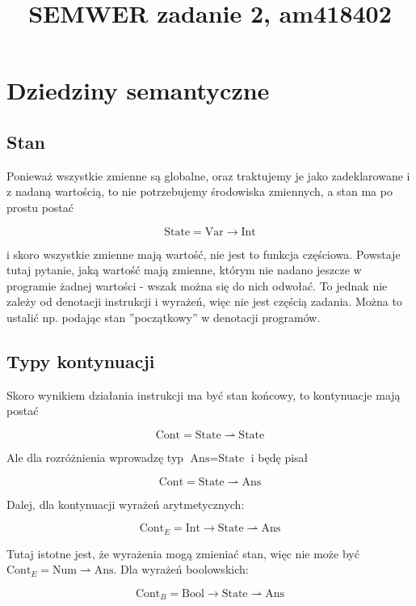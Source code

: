 \documentclass[a4paper]{article}
\begin{document}
\title{SEMWER zadanie 2, am418402}

\maketitle

\section*{Dziedziny semantyczne}

\subsection*{Stan}

Ponieważ wszystkie zmienne są globalne, oraz traktujemy je jako zadeklarowane i z nadaną wartością, to nie potrzebujemy środowiska zmiennych, a stan ma po prostu postać

$$
\text{State} = \text{Var} \longrightarrow \text{Int}
$$

i skoro wszystkie zmienne mają wartość, nie jest to funkcja częściowa. Powstaje tutaj pytanie, jaką wartość mają zmienne, którym nie nadano jeszcze w programie żadnej wartości - wszak można się do nich odwołać. To jednak nie zależy od denotacji instrukcji i wyrażeń, więc nie jest częścią zadania. Można to ustalić np. podając stan ''początkowy'' w denotacji programów.

\subsection*{Typy kontynuacji}

Skoro wynikiem działania instrukcji ma być stan końcowy, to kontynuacje mają postać

$$
\text{Cont} = \text{State} \rightharpoonup \text{State}
$$

Ale dla rozróżnienia wprowadzę typ $\text{Ans}=\text{State}$ i będę pisał

$$
\text{Cont} = \text{State} \rightharpoonup \text{Ans}
$$

Dalej, dla kontynuacji wyrażeń arytmetycznych:

$$
\text{Cont}_E = \text{Int} \longrightarrow \text{State} \rightharpoonup\text{Ans}
$$

Tutaj istotne jest, że wyrażenia mogą zmieniać stan, więc nie może być $\text{Cont}_E = \text{Num} \rightharpoonup \text{Ans}$. Dla wyrażeń boolowskich:

$$
\text{Cont}_B = \text{Bool} \longrightarrow \text{State} \rightharpoonup \text{Ans}
$$
\end{document}
